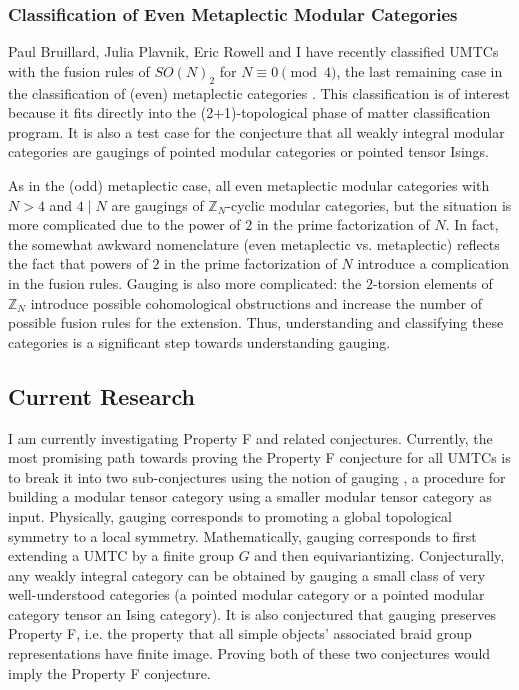 \documentclass[12pt]{article}
\newcommand{\ZZ}{\mathbb{Z}}
\theoremstyle{definition}
\begin{document}
\subsubsection*{Classification of Even Metaplectic Modular Categories}

Paul Bruillard, Julia Plavnik, Eric Rowell and I have recently classified UMTCs with the fusion rules of $SO(N)_2$ for $N \equiv 0 \pmod{4}$, the last remaining case in the classification of (even) metaplectic categories \cite{bgpr}.  This classification is of interest because it fits directly into the (2+1)-topological phase of matter classification program.  It is also a test case for the conjecture that all weakly integral modular categories are gaugings of pointed modular categories or pointed tensor Isings.

As in the (odd) metaplectic case,  all even metaplectic modular categories with $N > 4$ and $4 \mid N$ are gaugings of $\ZZ_{N}$-cyclic modular categories, but the situation is more complicated due to the power of $2$ in the prime factorization of $N$. In fact, the somewhat awkward nomenclature (even metaplectic vs. metaplectic) reflects the fact that powers of $2$ in the prime factorization of $N$ introduce a complication in the fusion rules.   Gauging is also more complicated: the $2$-torsion elements of $\ZZ_N$ introduce possible cohomological obstructions and increase the number of possible fusion rules for the extension.  Thus, understanding and classifying these categories is a significant step towards understanding gauging.

\subsection*{Current Research}

I am currently investigating Property F and related conjectures.  Currently, the most promising path towards proving the Property F conjecture for all UMTCs is to break it into two sub-conjectures using the notion of gauging \cite{bbcw}, a procedure for building a modular tensor category using  a smaller modular tensor category as input.   Physically, gauging corresponds to promoting a global topological symmetry to a local symmetry.  Mathematically, gauging corresponds to first extending a UMTC by a finite group $G$ and then equivariantizing. Conjecturally, any weakly integral category can be obtained by gauging a small class of very well-understood categories (a pointed modular category or a pointed modular category tensor an Ising category).   It is also conjectured that gauging  preserves Property F, i.e. the property that all simple objects’ associated braid group representations have finite image.  Proving both of these two conjectures would imply the Property F conjecture.
\end{document}
